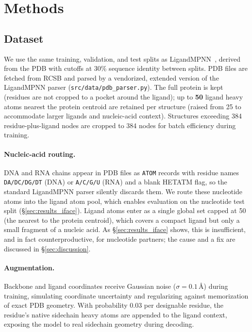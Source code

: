 \documentclass[11pt,letterpaper]{article}
\begin{document}
\section{Methods}
\label{sec:methods}

\subsection{Dataset}
\label{sec:data}

We use the same training, validation, and test splits as LigandMPNN~\citep{dauparas2025ligandmpnn},
derived from the PDB with cutoffs at 30\% sequence identity between splits. PDB files are fetched
from RCSB and parsed by a vendorized, extended version of the LigandMPNN parser
(\texttt{src/data/pdb\_parser.py}). The full protein is kept (residues are not cropped to a pocket around the ligand); up to
\textbf{50} ligand heavy atoms nearest the protein centroid are retained per structure (raised from 25 to
accommodate larger ligands and nucleic-acid context). Structures exceeding 384 residue-plus-ligand
nodes are cropped to 384 nodes for batch efficiency during training.

\paragraph{Nucleic-acid routing.}
DNA and RNA chains appear in PDB files as \texttt{ATOM} records with residue names
\texttt{DA/DC/DG/DT} (DNA) or \texttt{A/C/G/U} (RNA) and a blank HETATM flag, so the standard
LigandMPNN parser silently discards them. We route these nucleotide atoms into the ligand atom pool,
which enables evaluation on the nucleotide test split (\S\ref{sec:results_iface}). Ligand atoms enter as a single global
set capped at 50 (the nearest to the protein centroid), which covers a compact ligand but only a small
fragment of a nucleic acid. As \S\ref{sec:results_iface} shows, this is insufficient, and in fact
counterproductive, for nucleotide partners; the cause and a fix are discussed in \S\ref{sec:discussion}.

\paragraph{Augmentation.}
Backbone and ligand coordinates receive Gaussian noise ($\sigma{=}0.1$\,{\AA}) during training,
simulating coordinate uncertainty and regularizing against memorization of exact PDB geometry. With
probability 0.03 per designable residue, the residue's native sidechain heavy atoms are appended to
the ligand context, exposing the model to real sidechain geometry during decoding.
\end{document}
